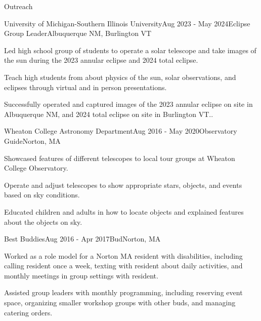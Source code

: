 \documentclass{resume} %
\begin{document}
\begin{rSection}{Outreach}

\begin{rSubsection}{University of Michigan-Southern Illinois University}{Aug 2023 - May 2024}{Eclipse Group Leader}{Albuquerque NM, Burlington VT}
    \item Led high school group of students to operate a solar telescope and take images of the sun during the 2023 annular eclipse and 2024 total eclipse.
    \item Teach high students from about physics of the sun, solar observations, and eclipses through virtual and in person presentations.
    \item Successfully operated and captured images of the 2023 annular eclipse on site in Albuquerque NM, and 2024 total eclipse on site in Burlington VT..
\end{rSubsection}
\newpage
\begin{rSubsection}{Wheaton College Astronomy Department}{Aug 2016 - May 2020}{Observatory Guide}{Norton, MA}
\item Showcased features of different telescopes to local tour groups at Wheaton College Observatory.
\item Operate and adjust telescopes to show appropriate stars, objects, and events based on sky conditions.
\item Educated children and adults in how to locate objects and explained features about the objects on sky.

\end{rSubsection}

\begin{rSubsection}{Best Buddies}{Aug 2016 - Apr 2017}{Bud}{Norton, MA}
    \item Worked as a role model for a Norton MA resident with disabilities, including calling resident once a week, texting with resident about daily activities, and monthly meetings in group settings with resident.
    \item Assisted group leaders with monthly programming, including reserving event space, organizing smaller workshop groups with other buds, and managing catering orders.
\end{rSubsection}

\end{rSection}
\end{document}
